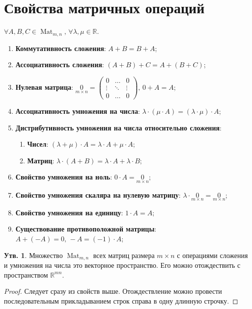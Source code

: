 \documentclass[12pt]{article}
\newcommand{\MR}{\mathbb{R}}
\theoremstyle{definition}
\newtheorem{prop}{Утв.}
\newcommand{\mat}[2]{\operatorname{Mat}_{#1, #2}}
\begin{document}
\section*{Свойства матричных операций}
$\forall A,B,C \in \mat{m}{n}, \,  \forall \lambda, \mu \in \MR$.
\begin{enumerate}[label=(\arabic*)]
	\item \textbf{Коммутативность сложения}: $ A + B = B + A$;
	\item \textbf{Ассоциативность сложения}: $ (A + B) + C = A + (B + C)$;
	\item \textbf{Нулевая матрица}: $
		\underset{m \times n}{0} = 
		\begin{pmatrix}
			0 & \dotsc & 0 \\
			\vdots & \ddots & \vdots \\
			0 & \dotsc & 0
		\end{pmatrix}, \, 0 + A = A$;
	\item \textbf{Ассоциативность умножения на числа}: $\lambda{\cdot}(\mu{\cdot}A) = (\lambda{\cdot}\mu){\cdot}A$;
	\item \textbf{Дистрибутивность умножения на числа относительно сложения}: 
		\begin{enumerate}[label=(\alph*)]
			\item \textbf{Чисел}: $ (\lambda + \mu){\cdot}A = \lambda{\cdot}A + \mu{\cdot}A$;
			\item \textbf{Матриц}: $ \lambda{\cdot}(A + B) = \lambda{\cdot}A + \lambda{\cdot}B$;
		\end{enumerate}
	\item \textbf{Свойство умножения на ноль}: $0{\cdot}A = \underset{m\times n}{0}$;
	\item \textbf{Свойство умножения скаляра на нулевую матрицу}: $\lambda{\cdot}\underset{m\times n}{0} = \underset{m\times n}{0}	$;
	\item \textbf{Свойство умножения на единицу}: $1{\cdot}A = A$;
	\item \textbf{Существование противоположной матрицы}:  $A +(-A) = 0, \, -A = (-1){\cdot}A$;
\end{enumerate}
\begin{prop}
	Множество $\mat{m}{n}$ всех  матриц размера $m \times n$ с операциями сложения и умножения на числа это векторное пространство. Его можно отождествить с пространством $\MR^{mn}$.
\end{prop}
\begin{proof}
	Следует сразу из свойств выше. Отождествление можно провести последовательным прикладыванием строк справа в одну длинную строчку.
\end{proof}
\end{document}
